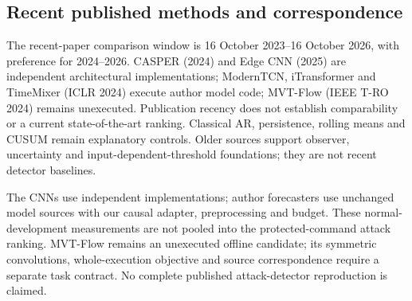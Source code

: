\subsection{Recent published methods and correspondence}
The recent-paper comparison window is 16 October 2023--16 October 2026, with preference for 2024--2026. CASPER (2024) and Edge CNN (2025) are independent architectural implementations; ModernTCN, iTransformer and TimeMixer (ICLR 2024) execute author model code; MVT-Flow (IEEE T-RO 2024) remains unexecuted. Publication recency does not establish comparability or a current state-of-the-art ranking. Classical AR, persistence, rolling means and CUSUM remain explanatory controls. Older sources support observer, uncertainty and input-dependent-threshold foundations; they are not recent detector baselines.



The CNNs use independent implementations; author forecasters use unchanged model sources with our causal adapter, preprocessing and budget. These normal-development measurements are not pooled into the protected-command attack ranking. MVT-Flow remains an unexecuted offline candidate; its symmetric convolutions, whole-execution objective and source correspondence require a separate task contract. No complete published attack-detector reproduction is claimed.
